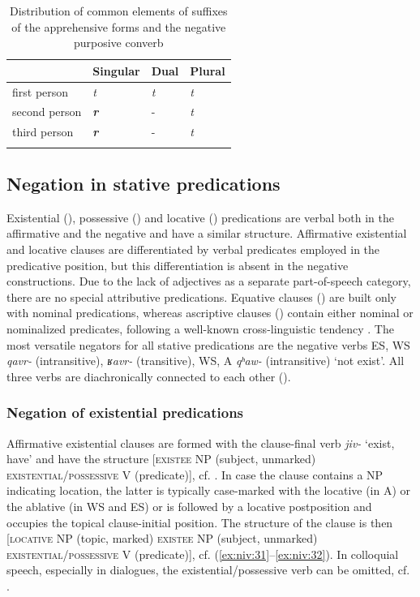 \documentclass[output=paper,colorlinks,citecolor=brown]{langscibook}
\begin{document}
\begin{table} 
\begin{tabularx}{.6\textwidth}{llll}
    \lsptoprule
    & {Singular} & {Dual} & {Plural}\\
    \midrule
    first person & \textit{t} & \textit{t} & \textit{t}\\
    second person & \textit{\textbf{r}} & - & \textit{t}\\ 
    third person & \textit{\textbf{r}} & - & \textit{t}\\
    \lspbottomrule
\end{tabularx}
\caption{Distribution of common elements of suffixes of the apprehensive forms and the negative purposive converb}
\label{tab:niv:2}
\end{table}

\subsection{Negation in stative predications}\label{sec:niv:2.3} 

Existential (), possessive () and locative () predications are verbal both in the affirmative and the negative and have a similar structure. Affirmative existential and locative clauses are differentiated by verbal predicates employed in the predicative position, but this differentiation is absent in the negative constructions. Due to the lack of adjectives as a separate part-of-speech category, there are no special attributive predications. Equative clauses () are built only with nominal predications, whereas ascriptive clauses () contain either nominal or nominalized predicates, following a well-known cross-linguistic tendency \citep{Veselinova2013neg.exist}. The most versatile negators for all stative predications are the negative verbs ES, WS \textit{qavr{}-} (intransitive), \textit{ʁavr{}-} (transitive), WS, A \textit{qʰaw-} (intransitive) ‘not exist’. All three verbs are diachronically connected to each other ().

\subsubsection{Negation of existential predications}\label{sec:niv:2.3.1} 

Affirmative existential clauses are formed with the clause-final verb \textit{jiv-} ‘exist, have’ and have the structure [\textsc{existee} NP (subject, unmarked) \textsc{existential/possessive} \textsc{V} (predicate)], cf. . In case the clause contains a NP indicating location, the latter is typically case-marked with the locative (in A) or the ablative (in WS and ES) or is followed by a locative postposition and occupies the topical clause-initial position. The structure of the clause is then [\textsc{locative} NP (topic, marked) \textsc{existee} NP (subject, unmarked) \textsc{existential/possessive} V (predicate)], cf. (\ref{ex:niv:31}--\ref{ex:niv:32}). In colloquial speech, especially in dialogues, the existential/possessive verb can be omitted, cf. .
\end{document}
